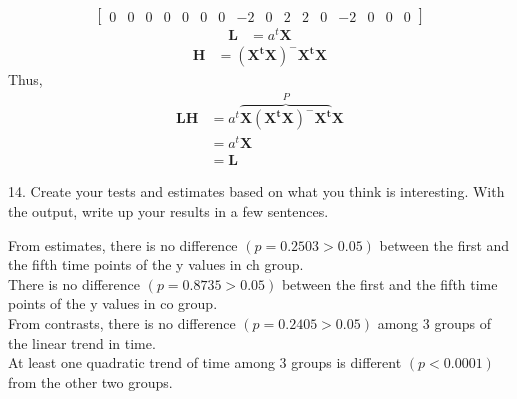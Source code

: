 \documentclass[12pt, utf8]{article}
\begin{document}
\[
\begin{bmatrix}
0 & 0 & 0 & 0 & 0 & 0 & 0 & -2 & 0 & 2 & 2 & 0 & -2 & 0 & 0 & 0
\end{bmatrix}
\]
\begin{eqnarray}
\boldsymbol{L}  &= a^t\boldsymbol{X} 
\end{eqnarray} 
\begin{eqnarray}
\boldsymbol{H} &= \boldsymbol{(X^{t}X)^{-}X^tX}
\end{eqnarray}
Thus,
\begin{equation}
\begin{split}
\boldsymbol{LH} &= a^t\overbrace{\boldsymbol{X}\boldsymbol{(X^{t}X)^{-}X^t}}^{P}\boldsymbol{X} \\
 &= a^t\boldsymbol{X} \\
 &= \boldsymbol{L}
\end{split}
\end{equation}

\begin{problem}
14. Create your tests and estimates based on what you think is interesting.  With the output, write up your results in a few sentences.
\end{problem}
From estimates, there is no difference $(p = 0.2503 > 0.05)$ between the first and the fifth time points of the y values in ch group.  \\
There is no difference $(p = 0.8735 > 0.05)$ between the first and the fifth time points of the y values in co group. \\
From contrasts, there is no difference $(p = 0.2405 > 0.05)$ among 3 groups of the linear trend in time. \\
At least one quadratic trend of time among 3 groups is different $(p < 0.0001)$  from the other two groups.
\end{document}
